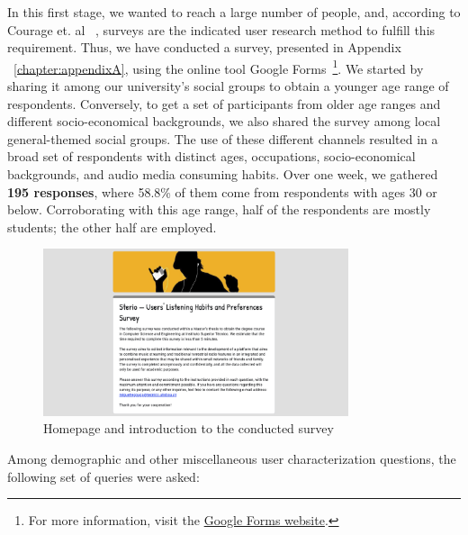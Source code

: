In this first stage, we wanted to reach a large number of people, and, according to Courage et. al ~\cite{Courage2005}, surveys are the indicated user research method to fulfill this requirement. Thus, we have conducted a survey, presented in Appendix ~\ref{chapter:appendixA}, using the online tool Google Forms~\footnote{For more information, visit the \href{http://forms.google.com/}{Google Forms website}.}. We started by sharing it among our university’s social groups to obtain a younger age range of respondents. Conversely, to get a set of participants from older age ranges and different socio-economical backgrounds, we also shared the survey among local general-themed social groups. The use of these different channels resulted in a broad set of respondents with distinct ages, occupations, socio-economical backgrounds, and audio media consuming habits. Over one week, we gathered \textbf{195 responses}, where 58.8\% of them come from respondents with ages 30 or below. Corroborating with this age range, half of the respondents are mostly students; the other half are employed.


\begin{figure}[h]
\centering
\includegraphics[width=0.8\textwidth]{./Images/survey.png}
\caption{Homepage and introduction to the conducted survey}
\label{fig:test_env}
\end{figure}

Among demographic and other miscellaneous user characterization questions, the following set of queries were asked:

